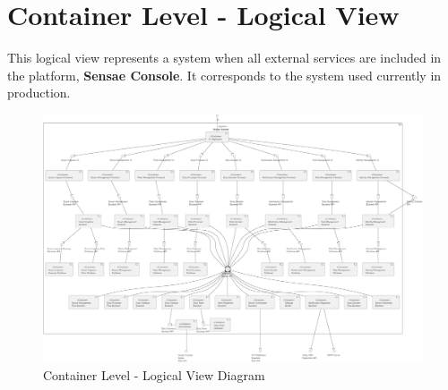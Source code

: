 \chapter{Container Level - Logical View}
\label{AppendixB}

This logical view represents a system when all external services are included in the platform, \textbf{Sensae Console}. It corresponds to the system used currently in production.

\begin{figure}
   \centering
   \includegraphics[page=1,width=0.8\columnwidth]{assets/diagrams/design/architectural/level2/logical/complete.pdf}
   \caption[Container Level - Logical View Diagram]{Container Level - Logical View Diagram}
   \label{fig:AppendixB:complete}
\end{figure}
